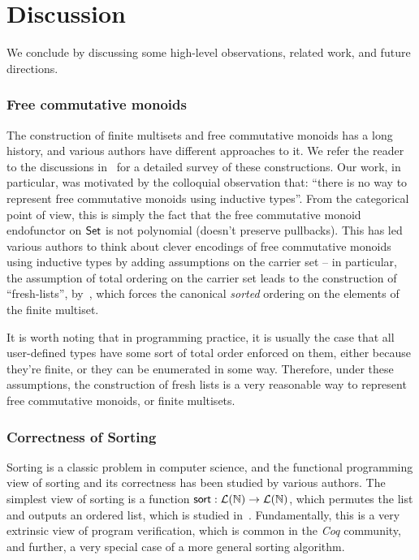 
\section{Discussion}
\label{sec:discussion}

We conclude by discussing some high-level observations, related work, and future directions.

\subsubsection*{Free commutative monoids}

The construction of finite multisets and free commutative monoids has a long history, and various authors have different
approaches to it. We refer the reader to the discussions
in~\cite{choudhuryFreeCommutativeMonoids2023,joramConstructiveFinalSemantics2023} for a detailed survey of these
constructions.
%
Our work, in particular, was motivated by the colloquial observation that:
``there is no way to represent free commutative monoids using inductive types''.
%
From the categorical point of view, this is simply the fact that the free commutative monoid endofunctor on $\mathsf{Set}$ is
not polynomial (doesn't preserve pullbacks).
%
This has led various authors to think about clever encodings of free commutative monoids using inductive types by adding
assumptions on the carrier set -- in particular, the assumption of total ordering on the carrier set leads to the
construction of ``fresh-lists'', by~\cite{kupkeFreshLookCommutativity2023}, which forces the canonical \emph{sorted}
ordering on the elements of the finite multiset.

It is worth noting that in programming practice,
it is usually the case that all user-defined types have some sort of total order enforced on them,
either because they're finite, or they can be enumerated in some way.
%
Therefore, under these assumptions, the construction of fresh lists is a very reasonable way to represent free
commutative monoids, or finite multisets.

\subsubsection*{Correctness of Sorting}

Sorting is a classic problem in computer science, and the functional programming view of sorting and its correctness has
been studied by various authors.
%
The simplest view of sorting is a function $\operatorname{\mathsf{sort}}: \mathcal{L}(\mathbb{N}) \to \mathcal{L}(\mathbb{N})$,
which permutes the list and outputs an ordered list, which is studied in~\cite{appelVerifiedFunctionalAlgorithms2023}.
%
Fundamentally, this is a very extrinsic view of program verification, which is common in the \emph{Coq} community,
and further, a very special case of a more general sorting algorithm.


